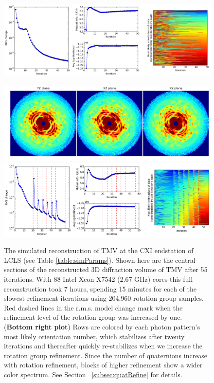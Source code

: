 \documentclass[]{iucr}              %
\begin{document}
\begin{figure}
\includegraphics[height=0.13\textheight]{figures/amo_low_log.png} \label{fig:amo_low_log}
\end{figure}

\begin{figure}
\caption{The simulated reconstruction of TMV at the CXI endstation of LCLS (see Table \ref{table:simParams}). Shown here are the central sections of the reconstructed 3D diffraction volume of TMV after 55 iterations. With 88 Intel Xeon X7542 (2.67 GHz) cores this full reconstruction took 7 hours, spending 15 minutes for each of the slowest refinement iterations using 204,960 rotation group samples. Red dashed lines in the r.m.s. model change mark when the refinement level of the rotation group was increased by one. ({\bf Bottom right plot}) Rows are colored by each photon pattern's most likely orientation number, which stabilizes after twenty iterations and thereafter quickly re-stabilizes when we increase the rotation group refinement. Since the number of quaternions increase with rotation refinement, blocks of higher refinement show a wider color spectrum. See Section ~\ref{subsec:quatRefine} for details.}
\includegraphics[width=\textwidth]{figures/cxi_intens_055.png} \label{fig:cxi_intens}
\includegraphics[width=\textwidth]{figures/cxi_log_fig.png} \label{fig:cxi_log}
\end{figure}
\end{document}

